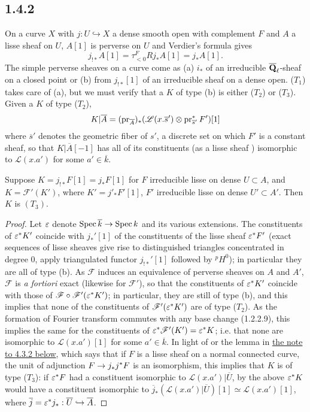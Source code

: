 \documentclass[deligne.tex]{subfiles}
\begin{document}
\subsection*{1.4.2}\label{laumon:1.4.2}
On a curve $X$ with $j:U\hookrightarrow X$
a dense smooth open with complement $F$ and $A$ a lisse sheaf on $U$,
$A[1]$ is perverse on $U$ and Verdier's formula \cite[2.2.4]{BBD} gives
\begin{equation*}
	j_{!*}A[1]=\tau^F_{<0}Rj_*A[1]=j_*A[1].
\end{equation*}
The simple perverse sheaves on a curve come as (a) $i_*$ of an irreducible
$\overline{\mathbf{Q}}_\ell$-sheaf on a closed point or (b) from $j_{!*}[1]$ of an
irreducible sheaf on a dense open.
($T_1$) takes care of (a), but we must verify that a $K$ of type (b)
is either ($T_2$) or ($T_3$). Given a $K$ of type ($T_2$),
\begin{equation*}
	K|\overline A=(\operatorname{pr}_{\overline A})_*(\mathscr L(x.\overline s')\otimes\operatorname{pr}_{\overline s'}^*F')[1]
\end{equation*}
where $\overline s'$ denotes the geometric fiber of $s'$, a discrete set
on which $F'$ is a constant sheaf, so that $K|\overline A[-1]$ has all of
its constituents (as a lisse sheaf \cite[1.1.6]{weilii}) isomorphic to
$\mathscr L(x.a')$ for some $a'\in\overline k$.
\begin{lemma*}
	Suppose $K=j_{!*}F[1]=j_*F[1]$ for $F$ irreducible lisse on dense 
	$U\subset A$, and $K=\mathscr F'(K')$, where $K'=j'_*F'[1]$, $F'$
	irreducible lisse on dense $U'\subset A'$.
	Then $K$ is $(T_3)$.
\end{lemma*}
\begin{proof}
Let $\varepsilon$ denote $\operatorname{Spec}\overline k\rightarrow\operatorname{Spec} k$ and its various extensions.
The constituents of $\varepsilon^*K'$ coincide with $j_*'[1]$ of the
constituents of the lisse sheaf $\varepsilon^*F'$
(exact sequences of lisse sheaves give rise to distinguished triangles
concentrated in degree 0, apply triangulated functor $j_{!*}'[1]$ followed
by $^pH^0$);
in particular they are all of type (b).
As $\mathscr F$ induces an equivalence of perverse sheaves on
$A$ and $A'$, $\mathscr F$ is \emph{a fortiori} exact
(likewise for $\mathscr F'$), so that the constituents of $\varepsilon^*K'$
coincide with those of $\mathscr F\circ\mathscr F'(\varepsilon^*K')$; in
particular, they are still of type (b), and this implies that none of
the constituents of $\mathscr F'(\varepsilon^*K')$ are of type ($T_2$).
As the formation of Fourier transform commutes with any base change
(1.2.2.9), this implies the same for the constituents of
$\varepsilon^*\mathscr F'(K')=\varepsilon^*K$; i.e. that none are isomorphic to
$\mathscr L(x.a')[1]$ for some $a'\in\overline k$.
In light of \cite[4.3.2]{BBD} or the lemma in
\hyperref[laumon:4.3.2]{the note to 4.3.2 below},
which says that if $F$ is a lisse sheaf on a normal connected curve, the
unit of adjunction $F\rightarrow j_*j^*F$ is an isomorphism, this implies that $K$
is of type ($T_3$): if $\varepsilon^*F$ had a constituent isomorphic to
$\mathscr L(x.a')|\overline U$, by the above $\varepsilon^*K$ would have a
constituent isomorphic to
$\overline j_*(\mathscr L(x.a')|\overline U)[1]\simeq\mathscr L(x.a')[1]$,
where $\overline j=\varepsilon^*j_*:\overline U\hookrightarrow\overline A$.
\end{proof}
\end{document}
